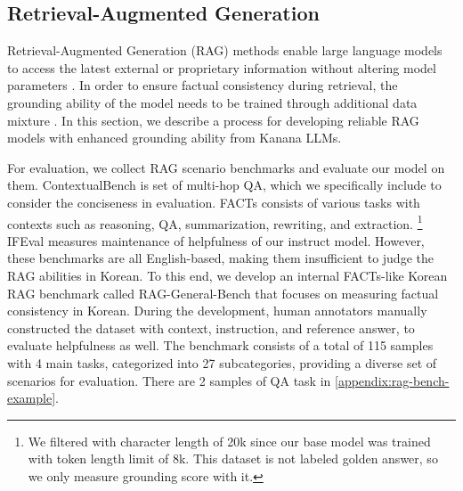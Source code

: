 \subsection{Retrieval-Augmented Generation}
Retrieval-Augmented Generation (RAG) methods \citep{lewis2021retrievalaugmentedgenerationknowledgeintensivenlp} enable large language models to access the latest external or proprietary information without altering model parameters \citep{liu2024chatqasurpassinggpt4conversational}.
In order to ensure factual consistency during retrieval, the grounding ability of the model needs to be trained through additional data mixture \citep{lin2024flamefactualityawarealignmentlarge}. 
In this section, we describe a process for developing reliable RAG models with enhanced grounding ability from Kanana LLMs. 

For evaluation, we collect RAG scenario benchmarks and evaluate our model on them.
ContextualBench \citep{nguyen2024sfrragcontextuallyfaithfulllms} is set of multi-hop QA, which we specifically include to consider the conciseness in evaluation. 
FACTs \citep{jacovi2025factsgroundingleaderboardbenchmarking} consists of various tasks with contexts such as reasoning, QA, summarization, rewriting, and extraction. 
\footnote{We filtered with character length of 20k since our base model was trained with token length limit of 8k. This dataset is not labeled golden answer, so we only measure grounding score with it.}
IFEval \citep{zhou2023instructionfollowingevaluationlargelanguage} measures maintenance of helpfulness of our instruct model. 
However, these benchmarks are all English-based, making them insufficient to judge the RAG abilities in Korean. 
To this end, we develop an internal FACTs-like Korean RAG benchmark called RAG-General-Bench that focuses on measuring factual consistency in Korean. 
During the development, human annotators manually constructed the dataset with context, instruction, and reference answer, to evaluate helpfulness as well. 
The benchmark consists of a total of 115 samples with 4 main tasks, categorized into 27 subcategories, providing a diverse set of scenarios for evaluation. There are 2 samples of QA task in \autoref{appendix:rag-bench-example}.


